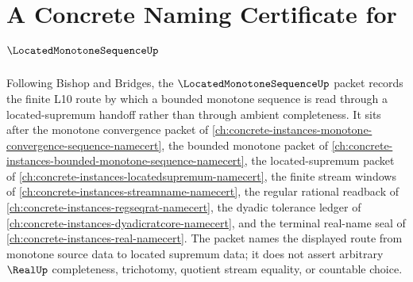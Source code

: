 \chapter{A Concrete Naming Certificate for $\LocatedMonotoneSequenceUp$}
\label{ch:concrete-instances-located-monotone-sequence-namecert}

Following Bishop and Bridges, the $\LocatedMonotoneSequenceUp$ packet records the finite L10 route by which a bounded monotone sequence is read through a located-supremum handoff rather than through ambient completeness. It sits after the monotone convergence packet of \autoref{ch:concrete-instances-monotone-convergence-sequence-namecert}, the bounded monotone packet of \autoref{ch:concrete-instances-bounded-monotone-sequence-namecert}, the located-supremum packet of \autoref{ch:concrete-instances-locatedsupremum-namecert}, the finite stream windows of \autoref{ch:concrete-instances-streamname-namecert}, the regular rational readback of \autoref{ch:concrete-instances-regseqrat-namecert}, the dyadic tolerance ledger of \autoref{ch:concrete-instances-dyadicratcore-namecert}, and the terminal real-name seal of \autoref{ch:concrete-instances-real-namecert}. The packet names the displayed route from monotone source data to located supremum data; it does not assert arbitrary $\RealUp$ completeness, trichotomy, quotient stream equality, or countable choice.

